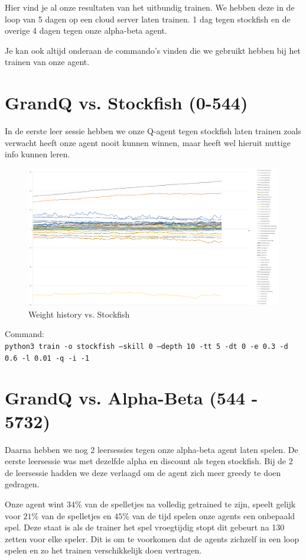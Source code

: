\documentclass[a4paper,openany]{uantwerpenassignment}
\newcommand{\codeword}[1]{
    \colorbox{code}{\texttt{\textcolor{codetext}{#1}}}
}
\begin{document}
Hier vind je al onze resultaten van het uitbundig trainen. We hebben deze in de loop van 5 dagen op een cloud server laten trainen. 1 dag tegen stockfish en de overige 4 dagen tegen onze alpha-beta agent.

Je kan ook altijd onderaan de commando's vinden die we gebruikt hebben bij het trainen van onze agent.

\section{GrandQ vs. Stockfish (0-544)}

In de eerste leer sessie hebben we onze Q-agent tegen stockfish laten trainen zoals verwacht heeft onze agent nooit kunnen winnen, maar heeft wel hieruit nuttige info kunnen leren.

\begin{figure}[h]
    \centering
    \includegraphics[width=\textwidth]{images/stockfish.png}
    \caption{Weight history vs. Stockfish}
    \label{fig:stockfish}
\end {figure}

Command:\\
\codeword{python3 train -o stockfish --skill 0 --depth 10 -tt 5 -dt 0 -e 0.3 -d 0.6 -l 0.01 -q -i -1}
\pagebreak

\section{GrandQ vs. Alpha-Beta (544 - 5732)}

Daarna hebben we nog 2 leersessies tegen onze alpha-beta agent laten spelen. De eerste leersessie was met dezelfde alpha en discount als tegen stockfish. Bij de 2 de leersessie hadden we deze verlaagd om de agent zich meer greedy te doen gedragen.

Onze agent wint $34\%$ van de spelletjes na volledig getrained te zijn, speelt gelijk voor $21\%$ van de spelletjes en $45\%$ van de tijd spelen onze agents een onbepaald spel. Deze staat is als de trainer het spel vroegtijdig stopt dit gebeurt na 130 zetten voor elke speler. Dit is om te voorkomen dat de agents zichzelf in een loop spelen en zo het trainen verschikkelijk doen vertragen.
\end{document}
